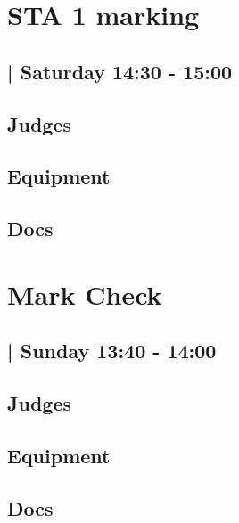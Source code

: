 \documentclass[10pt]{article}
\begin{document}
		\begin{minipage}{\linewidth}
		\setcounter{section}{46}
	\section{STA 1 marking }
	\subsection*{ | Saturday 14:30 - 15:00}

	

	\begin{multicols}{2}
	\subsection*{\faUsers \: Judges}
	\begin{itemize}
		\end{itemize}
	\columnbreak
	\subsection*{\faWrench \: Equipment}
	        \vfill\null
        \subsection*{\faFile \: Docs}
     	\end{multicols}


	\vspace{1cm}
	\end{minipage}

		\begin{minipage}{\linewidth}
		\setcounter{section}{47}
	\section{Mark Check }
	\subsection*{ | Sunday 13:40 - 14:00}

	

	\begin{multicols}{2}
	\subsection*{\faUsers \: Judges}
	\begin{itemize}
		\end{itemize}
	\columnbreak
	\subsection*{\faWrench \: Equipment}
	        \vfill\null
        \subsection*{\faFile \: Docs}
     	\end{multicols}


	\vspace{1cm}
	\end{minipage}
\end{document}
